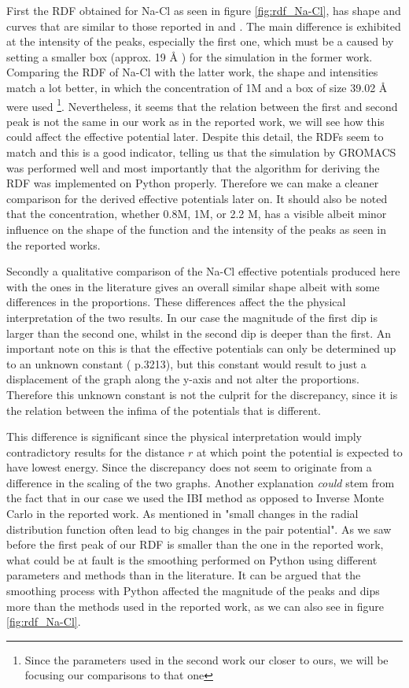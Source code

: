 \documentclass[10pt]{article}
\begin{document}
        First the RDF obtained for Na-Cl as seen in figure \ref{fig:rdf_Na-Cl}, has shape and curves that are similar to those reported in \cite{Lyubartsev1} and \cite{Lyubartsev2}. The main difference is exhibited at the intensity of the peaks, especially the first one, which must be a caused by setting a smaller box (approx. 19 $\si{\angstrom}$ ) for the simulation in the former work. Comparing the RDF of Na-Cl with the latter work, the shape and intensities match a lot better, in which the concentration of 1M and a box of size 39.02 $\si{\angstrom}$ were used \footnote{Since the parameters used in the second work our closer to ours, we will be focusing our comparisons to that one}. Nevertheless, it seems that the relation between the first and second peak is not the same in our work as in the reported work, we will see how this could affect the effective potential later. Despite this detail, the RDFs seem to match and this is a good indicator, telling us that the simulation by GROMACS was performed well and most importantly that the algorithm for deriving the RDF was implemented on Python properly. Therefore we can make a cleaner comparison for the derived effective potentials later on. It should also be noted that the concentration, whether 0.8M, 1M, or 2.2 M, has a visible albeit minor influence on the shape of the function and the intensity of the peaks as seen in the reported works.

        Secondly a qualitative comparison of the Na-Cl effective potentials produced here with the ones in the literature gives an overall similar shape albeit with some differences in the proportions. These differences affect the the physical interpretation of the two results. In our case the magnitude of the first dip is larger than the second one, whilst in \cite{Lyubartsev2} the second dip is deeper than the first. An important note on this is that the effective potentials can only be determined up to an unknown constant (\cite{Ruhle} p.3213), but this constant would result to just a displacement of the graph along the y-axis and not alter the proportions. Therefore this unknown constant is not the culprit for the discrepancy, since it is the relation between the infima of the potentials that is different.
        
        This difference is significant since the physical interpretation would imply contradictory results for the distance $r$ at which point the potential is expected to have lowest energy. Since the discrepancy does not seem to originate from a difference in the scaling of the two graphs. Another explanation \textit{could} stem from the fact that in our case we used the IBI method as opposed to Inverse Monte Carlo in the reported work. As mentioned in \cite{Ruhle} "small changes in the radial distribution function often lead to big changes in the pair potential". As we saw before the first peak of our RDF is smaller than the one in the reported work, what could be at fault is the smoothing performed on Python using different parameters and methods than in the literature. It can be argued that the smoothing process with Python affected the magnitude of the peaks and dips more than the methods used in the reported work, as we can also see in figure \ref{fig:rdf_Na-Cl}.
\end{document}
